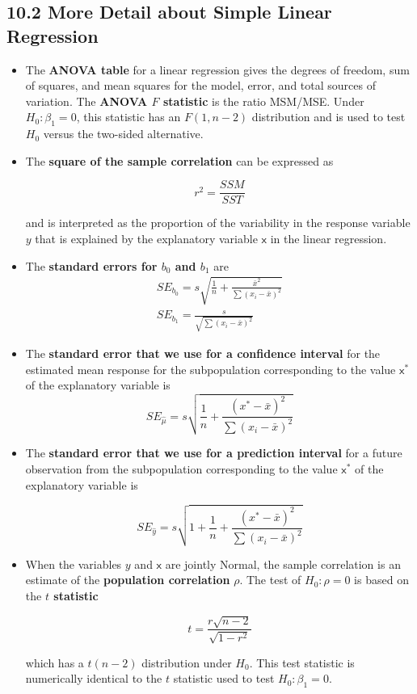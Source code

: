 	\subsection{10.2 More Detail about Simple Linear Regression}
		\begin{itemize}
			\item The \textbf{ANOVA table} for a linear regression gives the degrees of freedom, sum of squares, and mean squares for the model, error, and total sources of variation. The \textbf{ANOVA $F$ statistic} is the ratio MSM/MSE. Under $H_0: \beta_1 = 0$, this statistic has an $F(1, n - 2)$ distribution and is used to test $H_0$ versus the two-sided alternative.
			
			\item The \textbf{square of the sample correlation} can be expressed as
			
			\[r^2=\frac{SSM}{SST}\]
			
			and is interpreted as the proportion of the variability in the response variable $y$ that is explained by the explanatory variable $\mathsf{x}$ in the linear regression.
			
			\item The \textbf{standard errors for $b_0$ and $b_1$} are
			\[\begin{matrix} SE_{b_0}=s\sqrt{\frac{1}{n}+\frac{\bar{x}^2}{\sum (x_i-\bar{x})^2}}\\
			SE_{b_1}=\frac{s}{\sqrt{\sum (x_i-\bar{x})^2}}\end{matrix}\]
					
			\item The \textbf{standard error that we use for a confidence interval} for the estimated mean response for the subpopulation corresponding to the value $\mathsf{x}^{*}$ of the explanatory variable is
			\[SE_{\widehat{\mu}}=s\sqrt{\frac{1}{n}+\frac{(x^{*}-\bar{x})^2}{\sum (x_i-\bar{x})^2}}\]
			
			\item The \textbf{standard error that we use for a prediction interval} for a future observation from the subpopulation corresponding to the value $\mathsf{x}^{*}$ of the explanatory variable is
			
			\[SE_{\widehat{y}}=s\sqrt{1+\frac{1}{n}+\frac{(x^{*}-\bar{x})^2}{\sum (x_i-\bar{x})^2}}\]			
			\item When the variables $y$ and $\mathsf{x}$ are jointly Normal, the sample correlation is an estimate of the \textbf{population correlation} $\rho$. The test of $H_0: \rho = 0$ is based on the \textbf{$t$ statistic}
			
			\[t=\frac{r\sqrt{n-2}}{\sqrt{1-r^2}}\]
			
			which has a $t(n - 2)$ distribution under $H_0$. This test statistic is numerically identical to the $t$ statistic used to test $H_0: \beta_1 = 0$.
		\end{itemize}
	